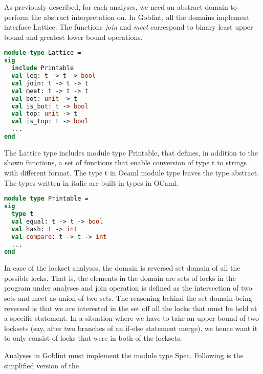 \documentclass[..thesis.tex]{subfiles}
\begin{document}
As previously described, for each analyses, we need an abstract domain to perform the abstract interpretation on. In Goblint, all the domains implement interface Lattice. The functions \textit{join} and \textit{meet} correspond to binary least upper bound and greatest lower bound operations.  


\begin{lstlisting}[language=Caml,style=caml]
module type Lattice =
sig
  include Printable
  val leq: t -> t -> bool
  val join: t -> t -> t
  val meet: t -> t -> t
  val bot: unit -> t
  val is_bot: t -> bool
  val top: unit -> t
  val is_top: t -> bool
  ...
end
\end{lstlisting}

The Lattice type includes module type Printable, that defines, in addition to the shown functions, a set of functions that enable conversion of type t to strings with different format. The type t in Ocaml module type leaves the type abstract. The types written in italic are built-in types in OCaml. 



\begin{lstlisting}[language=Caml,style=caml]
module type Printable =
sig
  type t
  val equal: t -> t -> bool
  val hash: t -> int
  val compare: t -> t -> int
  ...
end
\end{lstlisting}

In case of the lockset analyses, the domain is reversed set domain of all the possible locks. That is, the elements in the domain are sets of locks in the program under analyses and join operation is defined as the intersection of two sets and meet as union of two sets. The reasoning behind the set domain being reversed is that we are interested in the set off all the locks that must be held at a specific statement. In a situation where we have to take an upper bound of two locksets (say, after two branches of an if-else statement merge), we hence want it to only consist of locks that were in both of the locksets.

Analyses in Goblint must implement the module type Spec. Following is the simplified version of the

\end{document}
